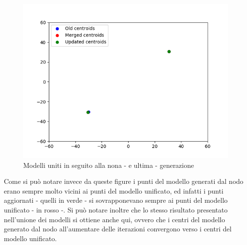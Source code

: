 \begin{figure}[!htb]
  \centering
  \includegraphics[scale=0.7]{../Immagini/update9.png}
  \caption{Modelli uniti in seguito alla nona - e ultima - generazione}
  \label{fig:update9}
\end{figure}
\newpage
Come si può notare invece da queste figure i punti del modello generati dal nodo erano sempre molto vicini ai punti del modello unificato, ed infatti i punti aggiornati - quelli in verde - si sovrapponevano sempre ai punti del modello unificato - in rosso -.
Si può notare inoltre che lo stesso risultato presentato nell'unione dei modelli si ottiene anche qui, ovvero che i centri del modello generato dal nodo all'aumentare delle iterazioni convergono verso i centri del modello unificato.
